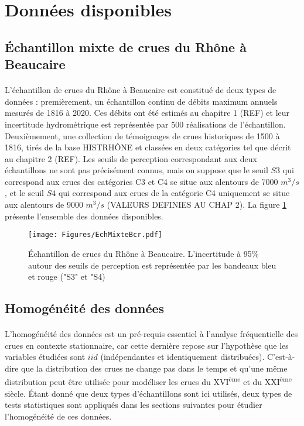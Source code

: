 \documentclass[11pt]{article}
\begin{document}
		
\section{Données disponibles}
\label{sec:dataBcr}

	\subsection{Échantillon mixte de crues du Rhône à Beaucaire}
	\paragraph{} L'échantillon de crues du Rhône à Beaucaire est constitué de deux types de données : premièrement, un échantillon continu de débits maximum annuels mesurés de 1816 à 2020. Ces débits ont été estimés au chapitre 1 (REF) et leur incertitude hydrométrique est représentée par 500 réalisations de l'échantillon. Deuxièmement, une collection de témoignages de crues historiques de 1500 à 1816, tirés de la base HISTRHÔNE et classées en deux catégories tel que décrit au chapitre 2 (REF). Les seuils de perception correspondant aux deux échantillons ne sont pas précisément connus, mais on suppose que le seuil $S3$ qui correspond aux crues des catégories C3 et C4 se situe aux alentours de 7000 $m^3/s$, et le seuil $S4$ qui correspond aux crues de la catégorie C4 uniquement se situe aux alentours de 9000 $m^3/s$ (VALEURS DEFINIES AU CHAP 2). La figure \ref{fig:EchMixte} présente l'ensemble des données disponibles. 
	
	\begin{figure}[h]
		\texttt{[image: Figures/EchMixteBcr.pdf]}	
		\caption{Échantillon de crues du Rhône à Beaucaire. L'incertitude à 95\% autour des seuils de perception est représentée par les bandeaux bleu et rouge ("S3" et "S4)}
		\label{fig:EchMixte}
	\end{figure}
	

	\subsection{Homogénéité des données}
	\label{subsec:homog}
	\paragraph{} L'homogénéité des données est un pré-requis essentiel à l'analyse fréquentielle des crues en contexte stationnaire, car cette dernière repose sur l'hypothèse que les variables étudiées sont $iid$ (indépendantes et identiquement distribuées). C'est-à-dire que la distribution des crues ne change pas dans le temps et qu'une même distribution peut être utilisée pour modéliser les crues du XVI\textsuperscript{ème} et du XXI\textsuperscript{ème} siècle. Étant donné que deux types d'échantillons sont ici utilisés, deux types de tests statistiques sont appliqués dans les sections suivantes pour étudier l'homogénéité de ces données. 
\end{document}
